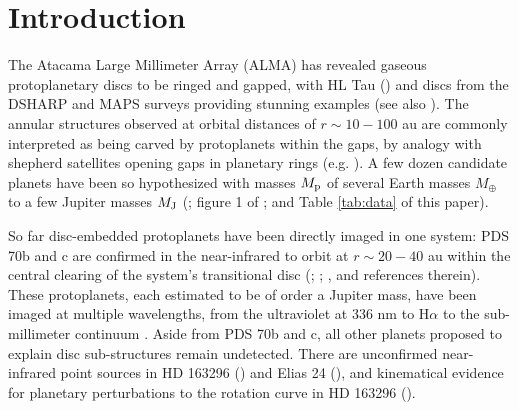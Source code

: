 \documentclass[fleqn,usenatbib]{mnras}
\newcommand{\Mearth}{M_{\oplus}}
\newcommand{\Mj}{M_{\rm J}}
\begin{document}
\section{Introduction}
\label{sec:Intro}

The Atacama Large Millimeter Array 
(ALMA) has revealed gaseous protoplanetary discs to be ringed and gapped, with HL Tau (\citealt{alma_etal_2015}) and discs from the DSHARP  \citep{andrews_etal_2018}
and MAPS \citep{oberg_etal_2021}
surveys providing stunning examples (see also \citealt{cieza_etal_2019, andrews_etal_2020}). The annular structures observed at orbital distances of $r \sim 10-100$ au are commonly interpreted as being carved by protoplanets within the gaps, by analogy with shepherd satellites opening gaps in planetary rings (e.g. \citealt{goldreich_tremaine_1979}). A few dozen candidate planets have been so hypothesized with masses $M_{\rm p}$ of several Earth masses $\Mearth$ to a few Jupiter masses $\Mj$  (\citealt{zhang_etal_2018}; figure 1 of \citealt{lodato_etal_2019}; and Table \ref{tab:data} of this paper).

So far disc-embedded protoplanets have been directly imaged in one system: PDS 70b and c are confirmed in the near-infrared to orbit at $r \sim 20-40$ au within the central clearing of the system's transitional disc (\citealt{keppler_etal_2018}; \citealt{haffert_etal_2019}; \citealt{wang_etal_2020, wang_etal_2021}, and references therein).
These protoplanets, each estimated to be of order a Jupiter mass, have been imaged at multiple wavelengths, from the ultraviolet at 336 nm \citep{zhou_etal_2021} to H$\alpha$ \citep{haffert_etal_2019} to the sub-millimeter continuum \citep{isella_etal_2019, benisty_etal_2021}. Aside from PDS 70b and c, all other planets proposed to explain disc sub-structures remain undetected. There are unconfirmed near-infrared point sources in HD 163296 (\citealt{guidi_etal_2018}) and Elias 24 (\citealt{jorquera_etal_2021}), and kinematical evidence for
planetary perturbations to the rotation curve in HD 163296 (\citealt{teague_etal_2018, teague_etal_2021}).
\end{document}
